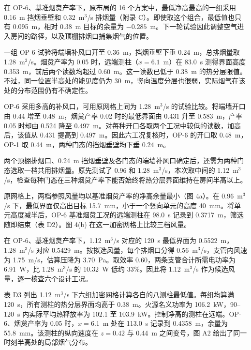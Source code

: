 在 OP-6、基准烟炱产率下，原布局的 16 个方案中，最低净高最高的一组采用 0.16~m 挡烟垂壁和 0.32~m$^3$/s 排烟量（附录 C）。即使取这个组合，最低值也只有 0.095~m，相对 0.38~m 目标的余量为 $-0.285$~m。下一轮试验因此调整空气进入房间的路径，以及顶棚排烟口捕集烟气的位置。

一组 OP-6 试验将端墙补风口开至 0.36~m，挡烟垂壁下垂 0.24~m，总排烟量取 1.28~m$^3$/s。烟炱产率为 0.05 时，远端测柱（$x=6.1$~m）在 83.0~s 测得界面高度 0.353~m，前后两个读数均超过 0.60~m。这一读数已低于 0.38~m 的热分层限值。不过，同一位置半高处的能见度仍为 30~m，竖向温度分层也很弱，实际烟气在该处的分布范围仍有不确定性。

OP-6 采用多高的补风口，可用原网格上同为 1.28~m$^3$/s 的试验比较。将端墙开口由 0.44 增至 0.48~m，烟炱产率 0.02 时的最低界面由 0.431 升至 0.583~m，产率 0.05 时却由 0.524 降至 0.497~m。对每种开口各取两个工况中较低的读数，加高后，该值从 0.431 提高到 0.497~m。因此六工况复核时，OP-6 的开口取 0.48~m，OP-1 取 0.44~m，两种门态的挡烟垂壁均下垂 0.24~m。

\clearpage
{}
两个顶棚排烟口、0.24~m 挡烟垂壁及各门态的端墙补风口确定后，还需为两种门态选取一档共用排烟量。原先测试了 0.96 和 1.28~m$^3$/s，本次取中间的 1.12~m$^3$/s，检查每种门态在三种烟炱产率下能否始终将热分层界面维持在房间半高以上。


原网格上，两档参照风量均以基准烟炱产率的净高余量最小（图 4a）。在 0.96~m$^3$/s 下，最低界面仅高出目标 15.7~mm，小于一个竖向单元的高度 40~mm。将单元高度减半后，OP-6 基准烟炱工况的远端测柱在 98.0~s 记录到 0.3717~m，筛选随即结束（表 D2）。图 4(b) 在这一加密网格上比较三档风量。

在 OP-6、基准烟炱产率下，1.12~m$^3$/s 对应的 120~s 最低界面为 0.5522~m，1.28~m$^3$/s 对应 0.5429~m。按拟选风量，每个排烟口分得 0.56~m$^3$/s，支管内风速为 1.75~m/s，估算压降为 3.70~Pa。取效率 0.60，两条支管合计所需电功率为 6.91~W，比 1.28~m$^3$/s 的 10.32~W 低约 33\%。因此将 1.12~m$^3$/s 作为候选风量，逐一核查六个设计工况。

\clearpage
{}
表 D3 列出 1.12~m$^3$/s 下六组加密网格计算各自的八测柱最低值。每组均算满 120~s，所有测柱的热分层界面均高于 0.38~m。火源名义功率为 106.2~kW，90--120~s 内实际平均热释放率为 102.1 至 103.9~kW。控制净高的测柱在远端。OP-6、烟炱产率为 0.05 时，$x=6.1$~m 处在 113.0~s 记录到 0.4358~m，余量为 55.8~mm。该测柱的纵向速度在 $z=0.42$ 与 0.44~m 之间变号，图 A2 给出了同一时刻半高处的局部烟气分布。

